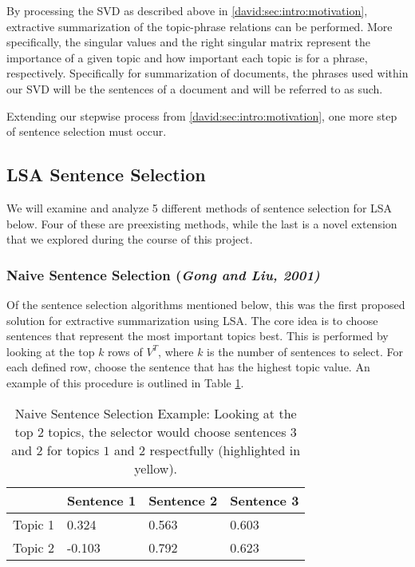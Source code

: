 \documentclass[../writeup.tex]{subfiles}
\begin{document}
By processing the SVD as described above in \ref{david:sec:intro:motivation}, extractive summarization of the topic-phrase relations can be performed. More specifically, the singular values and the right singular matrix represent the importance of a given topic and how important each topic is for a phrase, respectively.
Specifically for summarization of documents, the phrases used within our SVD will be the sentences of a document and will be referred to as such.

Extending our stepwise process from \ref{david:sec:intro:motivation}, one more step of sentence selection must occur.

\subsection{LSA Sentence Selection}\label{david:sec:lsa:sent-selection}

We will examine and analyze 5 different methods of sentence selection for LSA below. Four of these are preexisting methods, while the last is a novel extension that we explored during the course of this project. 

\subsubsection{Naive Sentence Selection (\emph{Gong and Liu, 2001)}}\label{david:sec:lsa:sent-selection:naive}

Of the sentence selection algorithms mentioned below, this was the first proposed solution for extractive summarization using LSA. 
The core idea is to choose sentences that represent the most important topics best.
This is performed by looking at the top $k$ rows of $V^T$, where $k$ is the number of sentences to select. For each defined row, choose the sentence that has the highest topic value. \autocite{lsa-implementation-naive} An example of this procedure is outlined in Table \ref{david:table:naive}.

\begin{table}
    \centering
    \begin{tabular}{|l|l|l|l|}
        \hline
                & Sentence 1 & Sentence 2                    & Sentence 3                    \\ \hline
        Topic 1 & 0.324      & 0.563                         & \cellcolor[HTML]{F8FF00}0.603 \\ \hline
        Topic 2 & -0.103     & \cellcolor[HTML]{F8FF00}0.792 & 0.623                         \\ \hline
    \end{tabular}
    \caption{Naive Sentence Selection Example: Looking at the top $2$ topics, the selector would choose sentences $3$ and $2$ for topics $1$ and $2$ respectfully (highlighted in yellow).}
    \label{david:table:naive}
\end{table}
\end{document}
